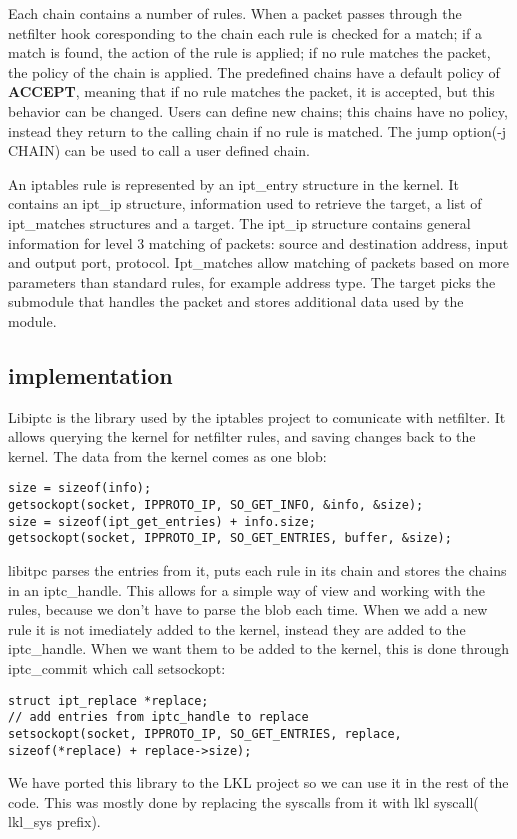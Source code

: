 Each chain contains a number of rules. When a packet passes through the netfilter hook coresponding to the chain each rule is checked
for a match; if a match is found, the action of the rule is applied; if no rule matches the packet, the policy of the chain is applied.
The predefined chains have a default policy of \textbf{ACCEPT}, meaning that if no rule matches the packet, it is accepted, but this behavior
can be changed. Users can define new chains; this chains have no policy, instead they return to the calling chain if no rule is matched.
The jump option(-j CHAIN) can be used to call a user defined chain.

An iptables rule is represented by an ipt_entry structure in the kernel. It contains an ipt_ip structure, information used
to retrieve the target, a list of ipt_matches structures and a target. The ipt_ip structure contains general information for
level 3 matching of packets: source and destination address, input and output port, protocol. Ipt_matches allow matching of
packets based on more parameters than standard rules, for example address type. The target picks the submodule that handles the 
packet and stores additional data used by the module.

\subsection{\text{\project} implementation}
\label{sub-sec:firewall-lkl}

Libiptc is the library used by the iptables project to comunicate with netfilter. It allows
querying the kernel for netfilter rules, and saving changes back to the kernel. The data from
the kernel comes as one blob:
\lstset{language=C,caption=Getting firewall rules,label=lst:sgetrule}
\begin{lstlisting}
size = sizeof(info);
getsockopt(socket, IPPROTO_IP, SO_GET_INFO, &info, &size); 
size = sizeof(ipt_get_entries) + info.size;
getsockopt(socket, IPPROTO_IP, SO_GET_ENTRIES, buffer, &size);
\end{lstlisting}
libitpc parses the entries from it, puts each rule in its chain and stores the chains in an iptc_handle. This allows for a simple way
of view and working with the rules, because we don't have to parse the blob each time. When we add a new rule
it is not imediately added to the kernel, instead they are added to the iptc_handle. When we want them to be added to the kernel,
this is done through iptc_commit which call setsockopt:
\lstset{language=C,caption=Commiting changes,label=lst:ssetrules}
\begin{lstlisting}
struct ipt_replace *replace;
// add entries from iptc_handle to replace
setsockopt(socket, IPPROTO_IP, SO_GET_ENTRIES, replace, sizeof(*replace) + replace->size);
\end{lstlisting}
We have ported this library to the LKL project so we can use it in the rest of the code. This was mostly done by replacing
the syscalls from it with lkl syscall( lkl_sys prefix).

